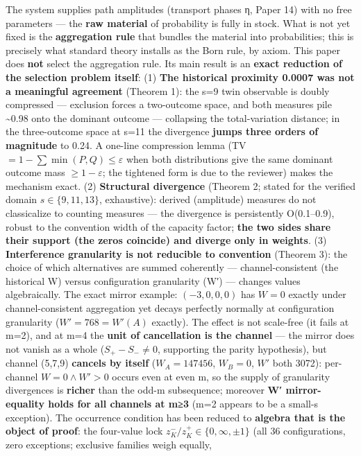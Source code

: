 \documentclass[
]{ltjsarticle}
\begin{document}
The system supplies path amplitudes (transport phases η, Paper 14) with
no free parameters --- the \textbf{raw material} of probability is fully
in stock. What is not yet fixed is the \textbf{aggregation rule} that
bundles the material into probabilities; this is precisely what standard
theory installs as the Born rule, by axiom. This paper does \textbf{not}
select the aggregation rule. Its main result is an \textbf{exact
reduction of the selection problem itself}: (1) \textbf{The historical
proximity 0.0007 was not a meaningful agreement} (Theorem 1): the s=9
twin observable is doubly compressed --- exclusion forces a two-outcome
space, and both measures pile \textasciitilde0.98 onto the dominant
outcome --- collapsing the total-variation distance; in the
three-outcome space at s=11 the divergence \textbf{jumps three orders of
magnitude} to 0.24. A one-line compression lemma (TV
\(=1-\sum\min(P,Q)\le\varepsilon\) when both distributions give the same
dominant outcome mass \(\ge1-\varepsilon\); the tightened form is due to
the reviewer) makes the mechanism exact. (2) \textbf{Structural
divergence} (Theorem 2; stated for the verified domain
\(s\in\{9,11,13\}\), exhaustive): derived (amplitude) measures do not
classicalize to counting measures --- the divergence is persistently
O(0.1--0.9), robust to the convention width of the capacity factor;
\textbf{the two sides share their support (the zeros coincide) and
diverge only in weights}. (3) \textbf{Interference granularity is not
reducible to convention} (Theorem 3): the choice of which alternatives
are summed coherently --- channel-consistent (the historical W) versus
configuration granularity (W′) --- changes values algebraically. The
exact mirror example: \((-3,0,0,0)\) has \(W=0\) exactly under
channel-consistent aggregation yet decays perfectly normally at
configuration granularity (\(W'=768=W'(A)\) exactly). The effect is not
scale-free (it fails at m=2), and at m=4 the \textbf{unit of
cancellation is the channel} --- the mirror does not vanish as a whole
(\(S_+-S_-\neq0\), supporting the parity hypothesis), but channel
(5,7,9) \textbf{cancels by itself} (\(W_A=147456\), \(W_B=0\), \(W'\)
both 3072): per-channel \(W=0\wedge W'>0\) occurs even at even m, so the
supply of granularity divergences is \textbf{richer} than the odd-m
subsequence; moreover \textbf{W′ mirror-equality holds for all channels
at m≥3} (m=2 appears to be a small-s exception). The occurrence
condition has been reduced to \textbf{algebra that is the object of
proof}: the four-value lock \(z^-_K/z^+_K\in\{0,\infty,\pm1\}\) (all 36
configurations, zero exceptions; exclusive families weigh equally,
\end{document}
